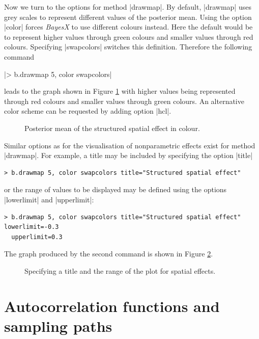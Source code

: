 Now we turn to the options for method |drawmap|. By default, |drawmap| uses grey scales to represent different values of the
posterior mean. Using the option |color| forces {\it BayesX} to use different colours instead. Here the default would be to
represent higher values through green colours and smaller values through red colours. Specifying |swapcolors| switches this
definition. Therefore the following command

|> b.drawmap 5, color swapcolors|

leads to the graph shown in Figure \ref{mcmc:spat3} with higher values being represented through red colours and smaller values
through green colours. An alternative color scheme can be requested by adding option |hcl|.

\begin{figure}[ht]
\begin{center}
{\it\caption{Posterior mean of the structured spatial effect in
colour.\label{mcmc:spat3}}}
\end{center}
\end{figure}

Similar options as for the visualisation of nonparametric effects exist for method |drawmap|. For example, a title may be
included by specifying the option |title|

\begin{verbatim}
> b.drawmap 5, color swapcolors title="Structured spatial effect"
\end{verbatim}

or the range of values to be displayed may be defined using the options |lowerlimit| and |upperlimit|:

\begin{verbatim}
> b.drawmap 5, color swapcolors title="Structured spatial effect" lowerlimit=-0.3
  upperlimit=0.3
\end{verbatim}

The graph produced by the second command is shown in Figure \ref{mcmc:spat4}.

\begin{figure}[ht]
\begin{center}
{\it\caption{Specifying a title and the range of the plot for
spatial effects.\label{mcmc:spat4}}}
\end{center}
\end{figure}

\section{Autocorrelation functions and sampling paths}\label{mcmc:postest}

